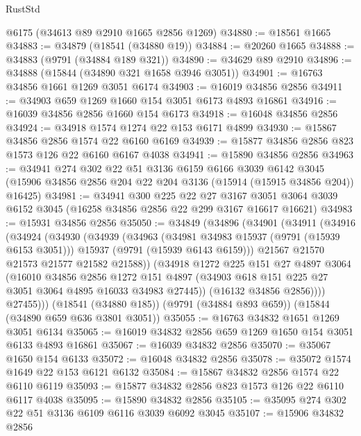 \begin{lexlean}{RustStd}
\begin{coremodule}
    @6175
    (@34613 @89 @2910 @1665 @2856 @1269)
@34880 := @18561 @1665
@34883 := @34879 (@18541 (@34880 @19))
@34884 := @20260 @1665
@34888 := @34883 (@9791 (@34884 @189 @321))
@34890 := @34629 @89 @2910
@34896 := @34888 (@15844 (@34890 @321 @1658 @3946 @3051))
@34901 := @16763 @34856 @1661 @1269 @3051 @6174
@34903 := @16019 @34856 @2856
@34911 := @34903 @659 @1269 @1660 @154 @3051 @6173 @4893 @16861
@34916 := @16039 @34856 @2856 @1660 @154 @6173
@34918 := @16048 @34856 @2856
@34924 := @34918 @1574 @1274 @22 @153 @6171 @4899
@34930 := @15867 @34856 @2856 @1574 @22 @6160 @6169
@34939 := @15877 @34856 @2856 @823 @1573 @126 @22 @6160 @6167 @4038
@34941 := @15890 @34856 @2856
@34963 := @34941
    @274
    @302
    @22
    @51
    @3136
    @6159
    @6166
    @3039
    @6142
    @3045
    (@15906 @34856 @2856 @204 @22 @204 @3136 (@15914 (@15915 @34856 @204)) @16425)
@34981 := @34941
    @300
    @225
    @22
    @27
    @3167
    @3051
    @3064
    @3039
    @6152
    @3045
    (@16258 @34856 @2856 @22 @299 @3167 @16617 @16621)
@34983 := @15931 @34856 @2856
@35050 := @34849
    (@34896
      (@34901
        (@34911
          (@34916
            (@34924
              (@34930
                (@34939
                  (@34963
                    (@34981 @34983 @15937 (@9791 (@15939 @6153 @3051)))
                    @15937
                    (@9791 (@15939 @6143 @6159)))
                  @21567
                  @21570
                  @21573
                  @21577
                  @21582
                  @21588))
              (@34918
                @1272
                @225
                @151
                @27
                @4897
                @3064
                (@16010
                  @34856
                  @2856
                  @1272
                  @151
                  @4897
                  (@34903 @618 @151 @225 @27 @3051 @3064 @4895 @16033 @34983 @27445))
                (@16132 @34856 @2856))))
          @27455)))
    (@18541 (@34880 @185))
    (@9791 (@34884 @893 @659))
    (@15844 (@34890 @659 @636 @3801 @3051))
@35055 := @16763 @34832 @1651 @1269 @3051 @6134
@35065 := @16019 @34832 @2856 @659 @1269 @1650 @154 @3051 @6133 @4893 @16861
@35067 := @16039 @34832 @2856
@35070 := @35067 @1650 @154 @6133
@35072 := @16048 @34832 @2856
@35078 := @35072 @1574 @1649 @22 @153 @6121 @6132
@35084 := @15867 @34832 @2856 @1574 @22 @6110 @6119
@35093 := @15877 @34832 @2856 @823 @1573 @126 @22 @6110 @6117 @4038
@35095 := @15890 @34832 @2856
@35105 := @35095 @274 @302 @22 @51 @3136 @6109 @6116 @3039 @6092 @3045
@35107 := @15906 @34832 @2856

\end{coremodule}
\end{lexlean}

